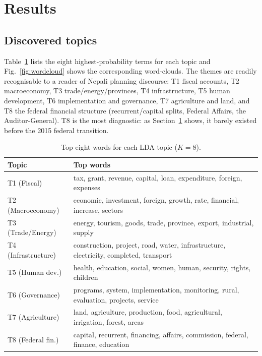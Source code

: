 \documentclass[conference]{IEEEtran}
\begin{document}
\section{Results}\label{sec:results}

\subsection{Discovered topics}
Table~\ref{tab:topics} lists the eight highest-probability terms for
each topic and Fig.~\ref{fig:wordcloud} shows the corresponding
word-clouds.  The themes are readily recognisable to a reader of
Nepali planning discourse: T1 fiscal accounts, T2 macroeconomy, T3
trade/energy/provinces, T4 infrastructure, T5 human development, T6
implementation and governance, T7 agriculture and land, and T8 the
federal financial structure (recurrent/capital splits, Federal
Affairs, the Auditor-General).  T8 is the most diagnostic: as
Section~\ref{sec:results} shows, it barely existed before the 2015
federal transition.

\begin{table}[t]
\caption{Top eight words for each LDA topic ($K=8$).}
\label{tab:topics}
\centering
\small
\begin{tabular}{ll}
\toprule
Topic & Top words \\ \midrule
T1 (Fiscal)        & tax, grant, revenue, capital, loan, expenditure, foreign, expenses \\
T2 (Macroeconomy)  & economic, investment, foreign, growth, rate, financial, increase, sectors \\
T3 (Trade/Energy)  & energy, tourism, goods, trade, province, export, industrial, supply \\
T4 (Infrastructure)& construction, project, road, water, infrastructure, electricity, completed, transport \\
T5 (Human dev.)    & health, education, social, women, human, security, rights, children \\
T6 (Governance)    & programs, system, implementation, monitoring, rural, evaluation, projects, service \\
T7 (Agriculture)   & land, agriculture, production, food, agricultural, irrigation, forest, areas \\
T8 (Federal fin.)  & capital, recurrent, financing, affairs, commission, federal, finance, education \\
\bottomrule
\end{tabular}
\end{table}
\end{document}
